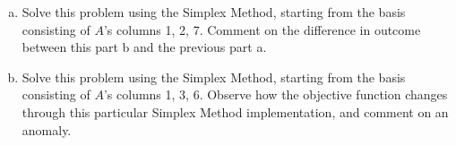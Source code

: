 \documentclass{article}
\begin{document}
\begin{enumerate}[1:]
\begin{enumerate}[a)]
			\item Solve this problem using the Simplex Method, starting from the basis consisting of $A$'s columns 1, 2, 7. Comment on the difference in outcome between this part b and the previous part a.
				

				\newpage
			\item Solve this problem using the Simplex Method, starting from the basis consisting of $A$'s columns 1, 3, 6. Observe how the objective function changes through this particular Simplex Method implementation, and comment on an anomaly.
				
				
		\end{enumerate}
\end{enumerate}
\end{document}
